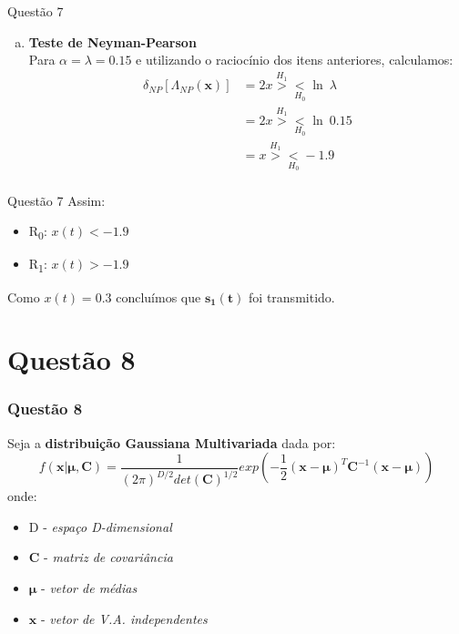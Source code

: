 \documentclass{beamer}\usepackage[]{graphicx}\usepackage[]{color}
\begin{document}
		\begin{frame}{Questão 7}
			\begin{enumerate}[c)]
				\item \textbf{Teste de Neyman-Pearson}\\
				Para $\alpha = \lambda =  0.15$ e utilizando o raciocínio dos itens anteriores, calculamos:
				\begin{align*}
				\delta_{NP}[\Lambda_{NP}(\boldsymbol{x})] &= 2x  \overset{H_{1}}{>} \underset{H_{0}}{<} \ln~ \lambda\\
				&= 2x  \overset{H_{1}}{>} \underset{H_{0}}{<} \ln~ 0.15\\
				&= x  \overset{H_{1}}{>} \underset{H_{0}}{<} -1.9\\
				\end{align*} 
			\end{enumerate}
		\end{frame}
		
		\begin{frame}{Questão 7}
			Assim:
			\begin{itemize}
				\item R\textsubscript{0}: $x(t) < -1.9$
				\item R\textsubscript{1}: $x(t) > -1.9$
			\end{itemize}
			Como $x(t) = 0.3$ concluímos que $\boldsymbol{s_{1}(t)}$ foi transmitido.\\
		\end{frame}
	\section{Questão 8}
		\begin{frame}
			\frametitle{Questão 8}
			Seja a \textbf{distribuição Gaussiana Multivariada} dada por:$$f(\boldsymbol{x} \lvert \boldsymbol{\mu, C}) = \frac{1}{(2\pi)^{D/2}det(\boldsymbol{C})^{1/2}}exp(-\frac{1}{2}(\boldsymbol{x} - \boldsymbol{\mu})^{T}\boldsymbol{C}^{-1}(\boldsymbol{x} - \boldsymbol{\mu}))$$
			onde:
			\begin{itemize}
				\item D - \textit{espaço D-dimensional}
				\item \textbf{C} - \textit{matriz de covariância}
				\item $\boldsymbol{\mu}$ - \textit{vetor de médias}
				\item $\boldsymbol{x}$ - \textit{vetor de V.A. independentes}
			\end{itemize}
		\end{frame}
		
\end{document}
